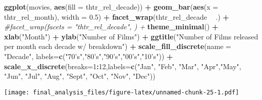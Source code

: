 \documentclass[]{article}
\newenvironment{Shaded}{\begin{snugshade}}{\end{snugshade}}
\newcommand{\KeywordTok}[1]{\textcolor[rgb]{0.13,0.29,0.53}{\textbf{#1}}}
\newcommand{\DataTypeTok}[1]{\textcolor[rgb]{0.13,0.29,0.53}{#1}}
\newcommand{\DecValTok}[1]{\textcolor[rgb]{0.00,0.00,0.81}{#1}}
\newcommand{\FloatTok}[1]{\textcolor[rgb]{0.00,0.00,0.81}{#1}}
\newcommand{\StringTok}[1]{\textcolor[rgb]{0.31,0.60,0.02}{#1}}
\newcommand{\CommentTok}[1]{\textcolor[rgb]{0.56,0.35,0.01}{\textit{#1}}}
\newcommand{\OperatorTok}[1]{\textcolor[rgb]{0.81,0.36,0.00}{\textbf{#1}}}
\newcommand{\NormalTok}[1]{#1}
\begin{document}
\begin{Shaded}
\begin{Highlighting}[]
\KeywordTok{ggplot}\NormalTok{(movies, }\KeywordTok{aes}\NormalTok{(}\DataTypeTok{fill =}\NormalTok{ thtr_rel_decade)) }\OperatorTok{+}
\StringTok{  }\KeywordTok{geom_bar}\NormalTok{(}\KeywordTok{aes}\NormalTok{(}\DataTypeTok{x =}\NormalTok{ thtr_rel_month), }\DataTypeTok{width =} \FloatTok{0.5}\NormalTok{) }\OperatorTok{+}
\StringTok{  }\KeywordTok{facet_wrap}\NormalTok{(thtr_rel_decade }\OperatorTok{~}\StringTok{ }\NormalTok{.) }\OperatorTok{+}
\StringTok{  }\CommentTok{#facet_wrap(facets = "thtr_rel_decade", ) +}
\StringTok{  }\KeywordTok{theme_minimal}\NormalTok{() }\OperatorTok{+}\StringTok{ }
\StringTok{  }\KeywordTok{xlab}\NormalTok{(}\StringTok{"Month"}\NormalTok{) }\OperatorTok{+}
\StringTok{  }\KeywordTok{ylab}\NormalTok{(}\StringTok{"Number of Films"}\NormalTok{) }\OperatorTok{+}
\StringTok{  }\KeywordTok{ggtitle}\NormalTok{(}\StringTok{"Number of Films released per month each decade w/ breakdown"}\NormalTok{) }\OperatorTok{+}
\StringTok{  }\KeywordTok{scale_fill_discrete}\NormalTok{(}\DataTypeTok{name =} \StringTok{"Decade"}\NormalTok{, }\DataTypeTok{labels=}\KeywordTok{c}\NormalTok{(}\StringTok{"70's"}\NormalTok{,}\StringTok{"80's"}\NormalTok{,}\StringTok{"90's"}\NormalTok{,}\StringTok{"00's"}\NormalTok{,}\StringTok{"10's"}\NormalTok{)) }\OperatorTok{+}\StringTok{ }
\StringTok{  }\KeywordTok{scale_x_discrete}\NormalTok{(}\DataTypeTok{breaks=}\DecValTok{1}\OperatorTok{:}\DecValTok{12}\NormalTok{,}\DataTypeTok{labels=}\KeywordTok{c}\NormalTok{(}\StringTok{"Jan"}\NormalTok{, }\StringTok{"Feb"}\NormalTok{, }\StringTok{"Mar"}\NormalTok{, }\StringTok{"Apr"}\NormalTok{,}\StringTok{"May"}\NormalTok{, }\StringTok{"Jun"}\NormalTok{, }\StringTok{"Jul"}\NormalTok{, }\StringTok{"Aug"}\NormalTok{, }\StringTok{"Sept"}\NormalTok{, }\StringTok{"Oct"}\NormalTok{, }\StringTok{"Nov"}\NormalTok{, }\StringTok{"Dec"}\NormalTok{))}
\end{Highlighting}
\end{Shaded}

\texttt{[image: final\_analysis\_files/figure-latex/unnamed-chunk-25-1.pdf]}
\end{document}
